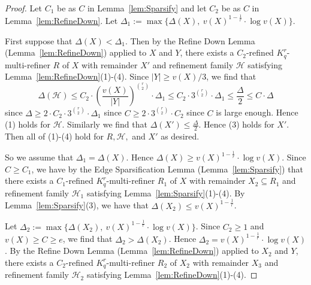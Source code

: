 \documentclass[11pt]{article}
\newcounter{i}
\theoremstyle{plain}
\theoremstyle{plain} %
\theoremstyle{definition}
\begin{document}
\begin{proof}
Let $C_1$ be as $C$ in Lemma~\ref{lem:Sparsify} and let $C_2$ be as $C$ in Lemma~\ref{lem:RefineDown}. Let $\Delta_1 := \max \{\Delta(X),~v(X)^{1-\frac{1}{r}}\cdot \log v(X)\}$. 

First suppose that $\Delta(X) < \Delta_1$. Then by the Refine Down Lemma (Lemma~\ref{lem:RefineDown}) applied to $X$ and $Y$, there exists a $C_2$-refined $K_q^r$-multi-refiner $R$ of $X$ with remainder $X'$ and refinement family $\mathcal{H}$ satisfying Lemma~\ref{lem:RefineDown}(1)-(4). Since $|Y|\ge v(X)/3$, we find that 
$$\Delta(\mathcal{H}) \le C_2 \cdot  \left(\frac{v(X)}{|Y|}\right)^{\binom{r}{2}} \cdot \Delta_1 \le C_2 \cdot 3^{\binom{r}{2}} \cdot \Delta_1 \le \frac{\Delta}{2} \le C\cdot \Delta$$
since $\Delta \ge 2\cdot C_2\cdot 3^{\binom{r}{2}}\cdot \Delta_1$ since $C\ge 2\cdot 3^{\binom{r}{2}}\cdot C_2$ since $C$ is large enough. Hence (1) holds for $\mathcal{H}$. Similarly we find that $\Delta(X')\le \frac{\Delta}{2}$. Hence (3) holds for $X'$. Then all of (1)-(4) hold for $R,\mathcal{H},$ and $X'$ as desired.

So we assume that $\Delta_1 = \Delta(X)$. Hence $\Delta(X)\ge v(X)^{1-\frac{1}{r}}\cdot \log v(X)$. Since $C\ge C_1$, we have by the Edge Sparsification Lemma (Lemma~\ref{lem:Sparsify}) that there exists a $C_1$-refined $K_q^r$-multi-refiner $R_1$ of $X$ with remainder $X_2\subseteq R_1$ and refinement family $\mathcal{H}_1$ satisfying Lemma~\ref{lem:Sparsify}(1)-(4). By Lemma~\ref{lem:Sparsify}(3), we have that $\Delta(X_2)\le v(X)^{1-\frac{1}{r}}$. 

Let $\Delta_2:= \max \{\Delta(X_2),~v(X)^{1-\frac{1}{r}}\cdot \log v(X)\}$. Since $C_2\ge 1$ and $v(X)\ge C \ge e$, we find that $\Delta_2 > \Delta(X_2)$. Hence $\Delta_2 = v(X)^{1-\frac{1}{r}}\cdot \log v(X)$. By the Refine Down Lemma (Lemma~\ref{lem:RefineDown}) applied to $X_2$ and $Y$, there exists a $C_2$-refined $K_q^r$-multi-refiner $R_2$ of $X_2$ with remainder $X_3$ and refinement family $\mathcal{H_2}$ satisfying Lemma~\ref{lem:RefineDown}(1)-(4).


\end{proof}
\end{document}
